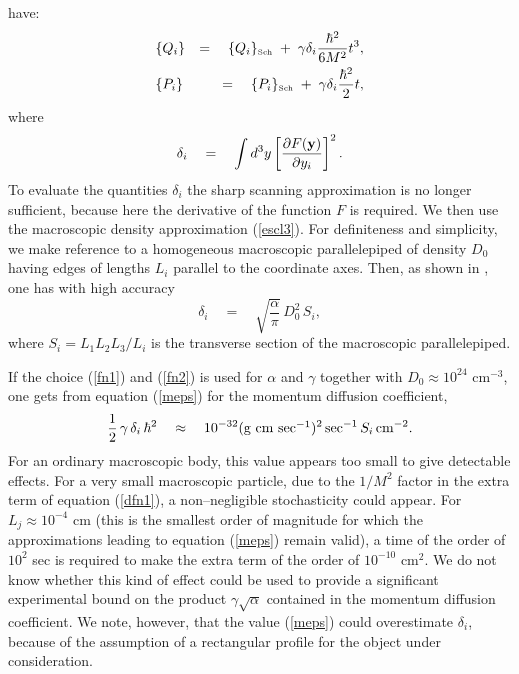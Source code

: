 \documentclass[12pt]{article}
\begin{document}
have:
\begin{eqnarray}
& \displaystyle\{ Q_i \} & = \quad \{ Q_i \}_{\makebox{\tiny Sch}}
\; + \; \gamma \delta_i \frac{\hbar^2}{6M^2} t^3,
\label{dfn1} \\
& \displaystyle\{ P_i \} & = \quad \{ P_i \}_{\makebox{\tiny Sch}}
\; + \; \gamma \delta_i \frac{\hbar^2}{2} t, \label{dfn3}
\end{eqnarray}
where
\begin{equation}
\delta_i \quad = \quad \int d^3 y \left[ \frac{\partial F ({\bf
y})}{\partial y_i} \right]^2.
\end{equation}
To evaluate the quantities $\delta_i$ the sharp scanning
approximation is no longer sufficient, because here the derivative
of the function $F$ is required. We then use the macroscopic
density approximation (\ref{escl3}). For definiteness and
simplicity, we make reference to a homogeneous macroscopic
parallelepiped of density $D_0$ having edges of lengths $L_i$
parallel to the coordinate axes. Then, as shown in \cite{csl}, one
has with high accuracy
\begin{equation} \label{meps}
\delta_i \quad = \quad \sqrt{\frac{\alpha}{\pi}}\, D_0^2\, S_i,
\end{equation}
where $S_i = L_1 L_2 L_3 / L_i$ is the transverse section of the
macroscopic parallelepiped.

If the choice (\ref{fn1}) and (\ref{fn2}) is used for $\alpha$ and
$\gamma$ together with $D_0 \approx 10^{24}$ cm$^{-3}$, one gets
from equation (\ref{meps}) for the momentum diffusion coefficient,
\begin{equation}
\frac{1}{2}\, \gamma\, \delta_i \, \hbar^2 \quad \approx \quad
10^{-32} (\makebox{g cm  sec$^{-1}$})^{2}\, \makebox{sec}^{-1}\,
S_i\, \makebox{cm}^{-2} .
\end{equation}
For an ordinary macroscopic body, this value appears too small to
give detectable effects. For a very small macroscopic particle,
due to the $1 / M^2$ factor in the extra term of equation
(\ref{dfn1}), a non--negligible stochasticity could appear. For
$L_j \approx 10^{-4}$ cm (this is the smallest order of magnitude
for which the approximations leading to equation (\ref{meps})
remain valid), a time of the order of $10^2$ sec is required to
make the extra term of the order of $10^{-10}$ cm$^2$. We do not
know whether this kind of effect could be used to provide a
significant experimental bound on the product $\gamma
\sqrt{\alpha}$ contained in the momentum diffusion coefficient. We
note, however, that the value (\ref{meps}) could overestimate
$\delta_i$, because of the assumption of a rectangular profile for
the object under consideration.
\end{document}
